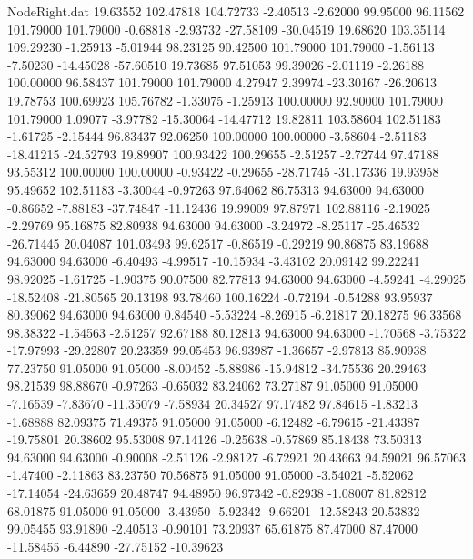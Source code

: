 \begin{filecontents}{NodeRight.dat}
  19.63552  102.47818  104.72733    -2.40513   -2.62000   99.95000   96.11562  101.79000  101.79000   -0.68818   -2.93732  -27.58109  -30.04519
  19.68620  103.35114  109.29230    -1.25913   -5.01944   98.23125   90.42500  101.79000  101.79000   -1.56113   -7.50230  -14.45028  -57.60510
  19.73685   97.51053   99.39026    -2.01119   -2.26188  100.00000   96.58437  101.79000  101.79000    4.27947    2.39974  -23.30167  -26.20613
  19.78753  100.69923  105.76782    -1.33075   -1.25913  100.00000   92.90000  101.79000  101.79000    1.09077   -3.97782  -15.30064  -14.47712
  19.82811  103.58604  102.51183    -1.61725   -2.15444   96.83437   92.06250  100.00000  100.00000   -3.58604   -2.51183  -18.41215  -24.52793
  19.89907  100.93422  100.29655    -2.51257   -2.72744   97.47188   93.55312  100.00000  100.00000   -0.93422   -0.29655  -28.71745  -31.17336
  19.93958   95.49652  102.51183    -3.30044   -0.97263   97.64062   86.75313   94.63000   94.63000   -0.86652   -7.88183  -37.74847  -11.12436
  19.99009   97.87971  102.88116    -2.19025   -2.29769   95.16875   82.80938   94.63000   94.63000   -3.24972   -8.25117  -25.46532  -26.71445
  20.04087  101.03493   99.62517    -0.86519   -0.29219   90.86875   83.19688   94.63000   94.63000   -6.40493   -4.99517  -10.15934   -3.43102
  20.09142   99.22241   98.92025    -1.61725   -1.90375   90.07500   82.77813   94.63000   94.63000   -4.59241   -4.29025  -18.52408  -21.80565
  20.13198   93.78460  100.16224    -0.72194   -0.54288   93.95937   80.39062   94.63000   94.63000    0.84540   -5.53224   -8.26915   -6.21817
  20.18275   96.33568   98.38322    -1.54563   -2.51257   92.67188   80.12813   94.63000   94.63000   -1.70568   -3.75322  -17.97993  -29.22807
  20.23359   99.05453   96.93987    -1.36657   -2.97813   85.90938   77.23750   91.05000   91.05000   -8.00452   -5.88986  -15.94812  -34.75536
  20.29463   98.21539   98.88670    -0.97263   -0.65032   83.24062   73.27187   91.05000   91.05000   -7.16539   -7.83670  -11.35079   -7.58934
  20.34527   97.17482   97.84615    -1.83213   -1.68888   82.09375   71.49375   91.05000   91.05000   -6.12482   -6.79615  -21.43387  -19.75801
  20.38602   95.53008   97.14126    -0.25638   -0.57869   85.18438   73.50313   94.63000   94.63000   -0.90008   -2.51126   -2.98127   -6.72921
  20.43663   94.59021   96.57063    -1.47400   -2.11863   83.23750   70.56875   91.05000   91.05000   -3.54021   -5.52062  -17.14054  -24.63659
  20.48747   94.48950   96.97342    -0.82938   -1.08007   81.82812   68.01875   91.05000   91.05000   -3.43950   -5.92342   -9.66201  -12.58243
  20.53832   99.05455   93.91890    -2.40513   -0.90101   73.20937   65.61875   87.47000   87.47000  -11.58455   -6.44890  -27.75152  -10.39623

\end{filecontents}
